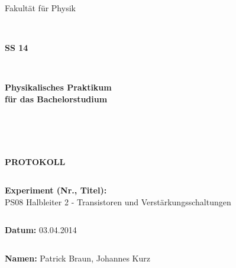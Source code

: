 \documentclass[12pt,a4paper]{article}
\begin{document}
\thispagestyle{empty}
			\begin{center}
			\Large{Fakultät für Physik}\\
			\end{center}
\begin{verbatim}


\end{verbatim}
			\begin{center}
			\textbf{\LARGE SS 14}
			\end{center}
\begin{verbatim}


\end{verbatim}
			\begin{center}
			\textbf{\LARGE{Physikalisches Praktikum\\ für das Bachelorstudium}}
			\end{center}
\begin{verbatim}




\end{verbatim}

			\begin{center}
			\textbf{\LARGE{PROTOKOLL}}
			\end{center}
			
\begin{verbatim}

\end{verbatim}

			\begin{flushleft}
			\textbf{\Large{Experiment (Nr., Titel):}}\\
			\LARGE{PS08 Halbleiter 2 - Transistoren und Verstärkungsschaltungen}	
			\end{flushleft}

\begin{verbatim}

\end{verbatim}	
			\begin{flushleft}
			\textbf{\Large{Datum:}} \Large{03.04.2014}
			\end{flushleft}
			
\begin{verbatim}
\end{verbatim}
		\begin{flushleft}
			\textbf{\Large{Namen:}} \Large{Patrick Braun, Johannes Kurz}
			\end{flushleft}
\end{document}
